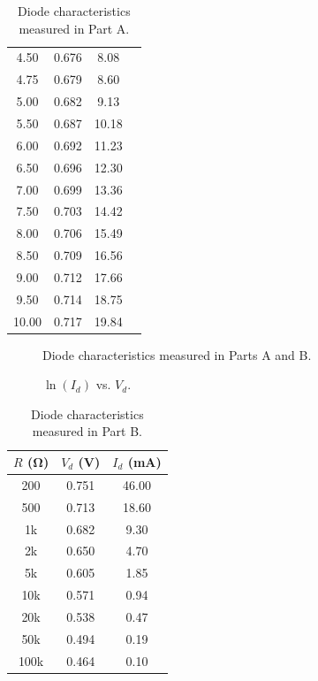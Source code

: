 \documentclass{article}
\begin{document}
\begin{table}[hbtp]
\begin{subtable}[t]{0.5\textwidth}
\begin{tabular}{cccc}
      4.50 & 0.676 & 8.08 \\
      4.75 & 0.679 & 8.60 \\
      5.00 & 0.682 & 9.13 \\
      5.50 & 0.687 & 10.18 \\
      6.00 & 0.692 & 11.23 \\
      6.50 & 0.696 & 12.30 \\
      7.00 & 0.699 & 13.36 \\
      7.50 & 0.703 & 14.42 \\
      8.00 & 0.706 & 15.49 \\
      8.50 & 0.709 & 16.56 \\
      9.00 & 0.712 & 17.66 \\
      9.50 & 0.714 & 18.75 \\
      10.00 & 0.717 & 19.84 \\
    \end{tabular}
  \end{subtable}
  \caption{\label{tab:part_a} Diode characteristics measured in Part A.}
\end{table}

\begin{figure}[hbtp]
  \centering
  
  \caption{\label{fig:combined_graph} Diode characteristics measured in Parts A and B.}
\end{figure}

%   

\begin{figure}[hbtp]
  \centering
  
  \caption{\label{fig:part_a_graph2} $\ln{(I_d)}$ vs. $V_d$.}
\end{figure}

\begin{table}[hbtp]
  \centering
  \begin{tabular}{ccc}
    $R$ (\si{\ohm}) & $V_d$ (\si{V}) & $I_d$ (\si{mA}) \\
    \hline
    200 & 0.751 & 46.00 \\
    500 & 0.713 & 18.60 \\
    1k & 0.682 & 9.30 \\
    2k & 0.650 & 4.70 \\
    5k & 0.605 & 1.85 \\
    10k & 0.571 & 0.94 \\
    20k & 0.538 & 0.47 \\
    50k & 0.494 & 0.19 \\
    100k & 0.464 & 0.10 \\
  \end{tabular}
  \caption{\label{tab:part_b} Diode characteristics measured in Part B.}
\end{table}
\end{document}
